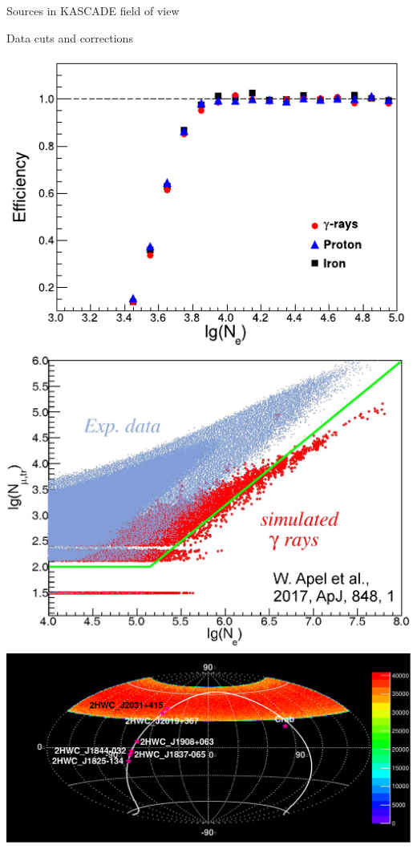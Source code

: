 \begin{frame}{Sources in KASCADE field of view}
\begin{minipage}[c]{0.25\textwidth}
\end{minipage}
\end{frame}

\begin{frame}{Data cuts and corrections}
\begin{center}
  \includegraphics[height=0.39\textheight]{pics/eff_Ne_Donghwa.pdf}\hspace{1em}
  \includegraphics[height=0.39\textheight]{pics/gamma_cut.png}\\
  \includegraphics[height=0.42\textheight]{pics/Skymap_6srcs_exp.pdf}
\end{center}
\end{frame}

